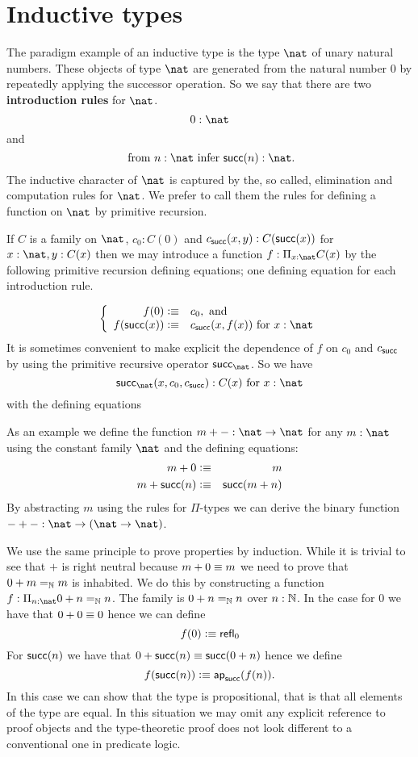 \section{Inductive types}
\label{sec:inductive-types}

The paradigm example of an inductive type is the type $\nat$ of unary natural numbers.  These objects of type $\nat$ are generated from the natural number $0$ by repeatedly applying the successor operation.  So we say that there are two {\bf introduction rules} for $\nat$. 
  \[ 0:\nat\]
and
  \[ \mbox{ from $n:\nat$ infer $\suc(n):\nat$}.\]
The inductive character of $\nat$ is captured by the, so called, elimination and computation rules for $\nat$.  We prefer to call them the rules for defining a function on $\nat$ by primitive recursion. 

If $C$ is a family on $\nat$, $c_0:C(0)$ and $c_{\mathsf{succ}}(x,y):C(\mathsf{succ}(x))$ for $x:\nat,y:C(x)$ then we may introduce a function $f:\Pi_{x:\nat}C(x)$ by the following primitive recursion defining equations; one defining equation for each introduction rule.

  \[\left\{\begin{array}{rl}
f(0)\defeq& c_0, \mbox{ and}\\
f(\suc(x))\defeq& c_\suc(x,f(x))\mbox{ for } x:\nat
  \end{array}\right.\]
It is sometimes convenient to make explicit the dependence of $f$ on $c_0$ and $c_{\mathsf{succ}}$ by using the primitive recursive operator $\rec_\nat$.  So we have
  \[ \rec_\nat(x,c_0,c_\suc):C(x)\mbox{ for } x:\nat\]
with the defining equations


As an example we define the function $m + - : \nat \to \nat$ for any
$m : \nat$ using the constant family $\nat$ and the defining
equations:
\begin{eqnarray*}
  m + 0 & \vcentcolon\equiv & m \\
  m + \mathsf{succ}(n) & \vcentcolon\equiv & \mathsf{succ}(m + n)
\end{eqnarray*}
By abstracting $m$ using the rules for $\Pi$-types we can derive the
binary function $- + - : \nat \to (\nat \to \nat)$.

We use the same principle to prove properties by induction. While it
is trivial to see that $+$ is right neutral because $m + 0 \equiv m$
we need to prove that $0 + m =_\mathbb{N} m$ is inhabited. We do this by
constructing a function $f : \Pi_{n : \nat} 0 + n =_\Nat n$. 
The family is $0 + n =_\mathbb{N} n$ over $n : \mathbb{N}$. In the case
for $0$ we have that $0 + 0 \equiv 0$ hence we can define
\[ f(0) \vcentcolon\equiv \mathsf{refl}_{0} \]
For $\mathsf{succ}(n)$ we have that $0 + \mathsf{succ}(n) \equiv \mathsf{succ}(0 +
n)$ hence we define 
\[ f(\mathsf{succ}(n)) \vcentcolon\equiv \mathsf{ap}_{\mathsf{succ}}(f(n)). \]
In this case we can show that the type is propositional, that is that
all elements of the type are equal. In this situation we may omit any
explicit reference to proof objects and the type-theoretic proof does
not look different to a conventional one in predicate logic. 

